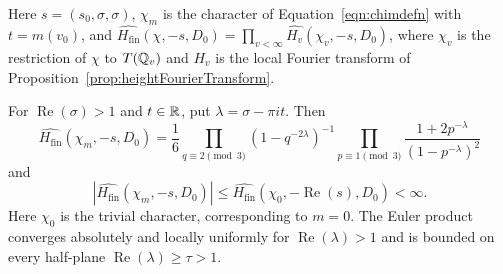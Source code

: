 \begin{lemma}

\label{lemma:finiteFourierProduct}


\leanok

Here $s=(s_0,\sigma,\sigma)$, $\chi_m$ is the character of Equation~\ref{eqn:chimdefn} with $t=m(v_0)$, and $\widehat{H_{\mathrm{fin}}}(\chi,-s,D_0)=\prod_{v<\infty}\widehat{H_v}(\chi_v,-s,D_0)$, where $\chi_v$ is the restriction of $\chi$ to $T(\mathbb{Q}_v)$ and $\widehat{H_v}$ is the local Fourier transform of Proposition~\ref{prop:heightFourierTransform}.

 For $\operatorname{Re}(\sigma)>1$ and $t\in\mathbb{R}$, put $\lambda=\sigma-\pi it$. Then \begin{equation*} \widehat{H_{\mathrm{fin}}}(\chi_m,-s,D_0) =\frac16 \prod_{q\equiv2\pmod3}(1-q^{-2\lambda})^{-1} \prod_{p\equiv1\pmod3} \frac{1+2p^{-\lambda}}{(1-p^{-\lambda})^2} \end{equation*} and \begin{equation*} \left|\widehat{H_{\mathrm{fin}}}(\chi_m,-s,D_0)\right| \leq\widehat{H_{\mathrm{fin}}}(\chi_0,{-\operatorname{Re}(s)},D_0)<\infty. \end{equation*} Here $\chi_0$ is the trivial character, corresponding to $m=0$. The Euler product converges absolutely and locally uniformly for $\operatorname{Re}(\lambda)>1$ and is bounded on every half-plane $\operatorname{Re}(\lambda)\geq\tau>1$. 

\end{lemma}

